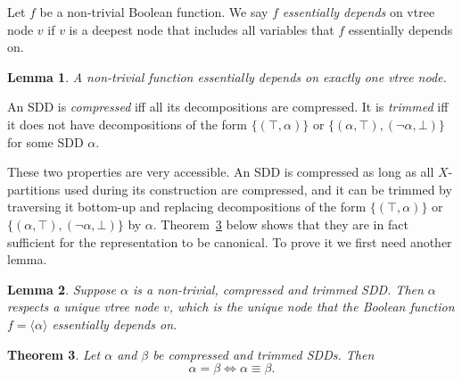 \documentclass[11pt]{article}
\newtheorem{theorem}{Theorem}[section]
\newtheorem{lemma}[theorem]{Lemma}
\newenvironment{definition}[1][Definition]{\begin{trivlist}
\item[\hskip \labelsep {\bfseries #1}]}{\end{trivlist}}
\begin{document}
\begin{definition}
Let $f$ be a non-trivial Boolean function. We say $f$ \textit{essentially depends} on vtree node $v$ if $v$ is a deepest node that includes all variables that $f$ essentially depends on. 
\end{definition}

\begin{lemma}
A non-trivial function essentially depends on exactly one vtree node.
\label{unique_vtree_function}
\end{lemma} 
 
\begin{definition}
An SDD is \textit{compressed} iff all its decompositions are compressed. It is \textit{trimmed} iff it does not have decompositions of the form $\{(\top, \alpha)\}$ or $\{(\alpha, \top), (\lnot\alpha, \bot)\}$ for some SDD $\alpha$.
\end{definition}


These two properties are very accessible. An SDD is compressed as long as all $X$-partitions used during its construction are compressed, and it can be trimmed by traversing it bottom-up and replacing decompositions of the form  $\{(\top, \alpha)\}$ or $\{(\alpha, \top), (\lnot\alpha, \bot)\}$ by $\alpha$. 
Theorem~\ref{canonicity} below shows that they are in fact sufficient for the representation to be canonical. To prove it we first need another lemma. 

\begin{lemma}
Suppose $\alpha$ is a non-trivial, compressed and trimmed SDD. Then $\alpha$ respects a unique vtree node $v$, which is the unique node that the Boolean function $f = \langle \alpha \rangle$ essentially depends on.
\label{unique_vtree_sdd}
\end{lemma}

\begin{theorem} 
\label{canonicity}
Let $\alpha$ and $\beta$ be compressed and trimmed SDDs. Then $$\alpha = \beta \Leftrightarrow \alpha \equiv \beta.$$
\end{theorem}
\end{document}
